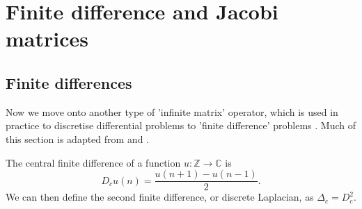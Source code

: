 \documentclass[../main.tex]{subfiles}
\begin{document}
\section{Finite difference and Jacobi matrices}

\subsection{Finite differences}
Now we move onto another type of 'infinite matrix' operator, which is used in
practice to discretise differential problems to 'finite difference' problems 
\cite{suli2003introduction}. Much of this section is adapted from \cite{stolz2004seminar}
  and \cite{teschl2000jacobi}.

\begin{definition}
  The central finite difference of a function $u: \mathbb{Z} \rightarrow
  \mathbb{C}$ is 
  $$D_c u (n) = \frac{u(n+1) - u(n-1)}{2}.$$
  We can then define the second finite difference, or discrete Laplacian, as
  $\Delta_c = D_c^2$.
\end{definition}
\end{document}
